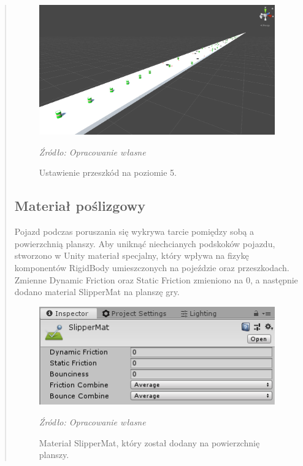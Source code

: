\begin{quotation}
\begin{figure}[!hbt]
\centering
  \includegraphics[width=1\linewidth]{scena5.png}
  \caption{Ustawienie przeszkód na poziomie 5.}\label{rys_18}
  \begin{minipage}[t]{0.75\linewidth}
    \emph{Źródło: Opracowanie własne}
  \end{minipage}
\end{figure}

\newpage
\subsection{Materiał poślizgowy}
\indent Pojazd podczas poruszania się wykrywa tarcie pomiędzy sobą a powierzchnią planszy. Aby uniknąć niechcianych podskoków pojazdu, stworzono w Unity materiał specjalny, który wpływa na fizykę komponentów RigidBody umieszczonych na pojeździe oraz przeszkodach. Zmienne Dynamic Friction oraz Static Friction zmieniono na 0, a następnie dodano material SlipperMat na planszę gry.


\begin{figure}[!hbt]
\centering
  \includegraphics[width=1\linewidth]{slippermat.png}
  \caption{Materiał SlipperMat, który został dodany na powierzchnię planszy.}\label{rys_19}
  \begin{minipage}[t]{0.75\linewidth}
    \emph{Źródło: Opracowanie własne}
  \end{minipage}
\end{figure}
\newpage

\end{quotation}

